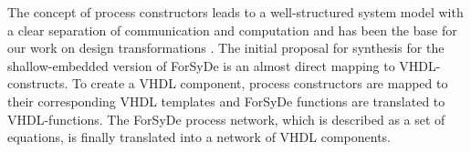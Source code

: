 The concept of process constructors leads to a well-structured system model with a clear separation of communication and computation and has been the base for our work on design transformations \cite{SanJan2004a, RauSan2008a}. The initial proposal for synthesis for the shallow-embedded version of ForSyDe \cite{SanJan1999b} is an almost direct mapping  to VHDL-constructs. To create a VHDL component, process constructors are mapped to their corresponding VHDL templates and ForSyDe functions are translated to VHDL-functions. The ForSyDe process network, which is described as a set of equations, is finally translated into a network of VHDL components.  




 











 



 











